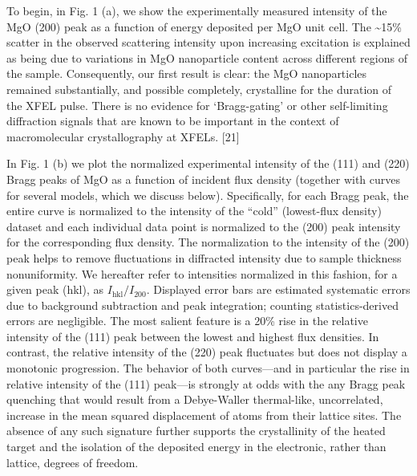 To begin, in Fig. 1 (a), we show the experimentally measured intensity
of the MgO (200) peak as a function of energy deposited per MgO unit
cell. The \textasciitilde{}15\% scatter in the observed scattering
intensity upon increasing excitation is explained as being due to
variations in MgO nanoparticle content across different regions of the
sample. Consequently, our first result is clear: the MgO nanoparticles
remained substantially, and possible completely, crystalline for the
duration of the XFEL pulse. There is no evidence for `Bragg-gating' or
other self-limiting diffraction signals that are known to be important
in the context of macromolecular crystallography at XFELs. {[}21{]}

In Fig. 1 (b) we plot the normalized experimental intensity of the (111)
and (220) Bragg peaks of MgO as a function of incident flux density
(together with curves for several models, which we discuss below).
Specifically, for each Bragg peak, the entire curve is normalized to the
intensity of the ``cold'' (lowest-flux density) dataset and each
individual data point is normalized to the (200) peak intensity for the
corresponding flux density. The normalization to the intensity of the
(200) peak helps to remove fluctuations in diffracted intensity due to
sample thickness nonuniformity. We hereafter refer to intensities
normalized in this fashion, for a given peak (hkl), as
\(I_{\text{hkl}}/I_{200}\). Displayed error bars are estimated
systematic errors due to background subtraction and peak integration;
counting statistics-derived errors are negligible. The most salient
feature is a 20\% rise in the relative intensity of the (111) peak
between the lowest and highest flux densities. In contrast, the relative
intensity of the (220) peak fluctuates but does not display a monotonic
progression. The behavior of both curves---and in particular the rise in
relative intensity of the (111) peak---is strongly at odds with the any
Bragg peak quenching that would result from a Debye-Waller thermal-like,
uncorrelated, increase in the mean squared displacement of atoms from
their lattice sites. The absence of any such signature further supports
the crystallinity of the heated target and the isolation of the
deposited energy in the electronic, rather than lattice, degrees of
freedom.

